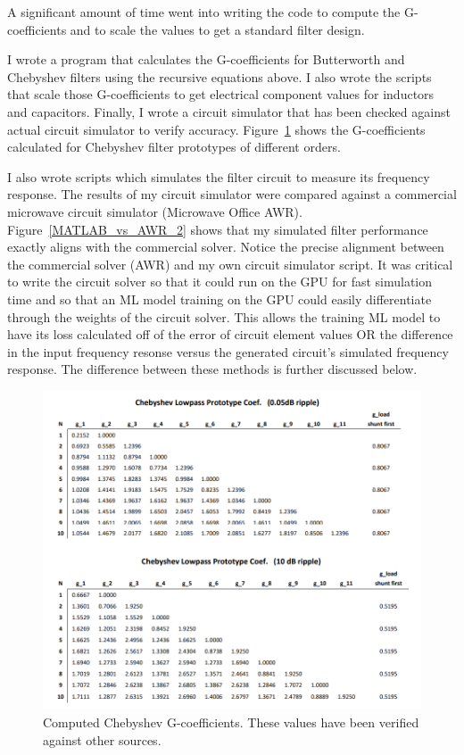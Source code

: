 \documentclass[10pt,conference]{IEEEtran}
\begin{document}
A significant amount of time went into writing the code to compute the G-coefficients and to scale the values to get a standard filter design. 

I wrote a program that calculates the G-coefficients for Butterworth and Chebyshev filters using the recursive equations above. I also wrote the scripts that scale those G-coefficients to get electrical component values for inductors and capacitors. Finally, I wrote a circuit simulator that has been checked against actual circuit simulator to verify accuracy. Figure~\ref{Chebyshev_G_coefs} shows the G-coefficients calculated for Chebyshev filter prototypes of different orders.


I also wrote scripts which simulates the filter circuit to measure its frequency response. The results of my circuit simulator were compared against a commercial microwave circuit simulator (Microwave Office AWR). Figure~\ref{MATLAB_vs_AWR_2} shows that my simulated filter performance exactly aligns with the commercial solver. Notice the precise alignment between the commercial solver (AWR) and my own circuit simulator script. It was critical to write the circuit solver so that it could run on the GPU for fast simulation time and so that an ML model training on the GPU could easily differentiate through the weights of the circuit solver. This allows the training ML model to have its loss calculated off of the error of circuit element values OR the difference in the input frequency resonse versus the generated circuit's simulated frequency response. The difference between these methods is further discussed below.




\begin{figure}
	\centering
	\includegraphics[width=0.9\linewidth]{Figures/Chebyshev_G_coefs.png}
	\caption{Computed Chebyshev G-coefficients. These values have been verified against other sources.}
	\label{Chebyshev_G_coefs}
\end{figure}
\end{document}
